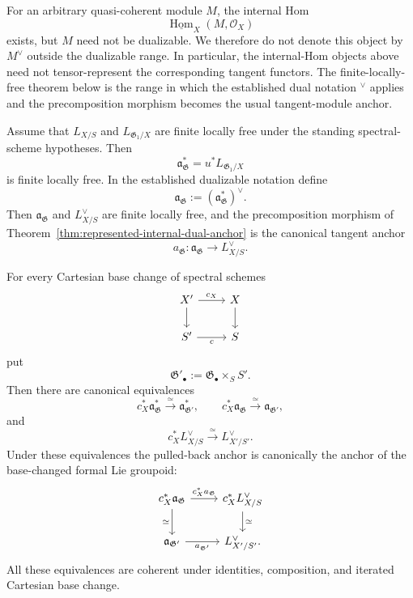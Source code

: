 \begin{remark}
\label{rem:internal-dual-not-tangent-representing}
For an arbitrary quasi-coherent module $M$, the internal Hom
\[
    \underline{\operatorname{Hom}}_X(M,\mathcal O_X)
\]
exists, but $M$ need not be dualizable.  We therefore do not denote this
object by $M^\vee$ outside the dualizable range.  In particular, the
internal-Hom objects above need not tensor-represent the corresponding
tangent functors.  The finite-locally-free theorem below is the range in
which the established dual notation ${}^\vee$ applies and the
precomposition morphism becomes the usual tangent-module anchor.
\end{remark}

\begin{theorem}
\label{thm:represented-first-order-anchor}
Assume that $L_{X/S}$ and
$L_{\mathfrak G_1/X}$ are finite locally free under the standing
spectral-scheme hypotheses.  Then
\[
    \mathfrak a_{\mathfrak G}^{*}
    =
    u^*L_{\mathfrak G_1/X}
\]
is finite locally free.  In the established dualizable notation define
\[
    \mathfrak a_{\mathfrak G}
    :=
    \left(
        \mathfrak a_{\mathfrak G}^{*}
    \right)^\vee.
\]
Then $\mathfrak a_{\mathfrak G}$ and $L_{X/S}^{\vee}$ are finite locally free,
and the precomposition morphism of
Theorem~\ref{thm:represented-internal-dual-anchor} is the canonical tangent
anchor
\[
\boxed{
    a_{\mathfrak G}:
    \mathfrak a_{\mathfrak G}
    \longrightarrow
    L_{X/S}^{\vee}.
}
\]

For every Cartesian base change of spectral schemes
\[
\begin{tikzcd}
X' \arrow[r,"c_X"] \arrow[d] &
X \arrow[d]\\
S' \arrow[r,"c"'] &
S
\end{tikzcd}
\]
put
\[
    \mathfrak G'_\bullet
    :=
    \mathfrak G_\bullet\times_SS'.
\]
Then there are canonical equivalences
\[
    c_X^*\mathfrak a_{\mathfrak G}^{*}
    \xrightarrow{\simeq}
    \mathfrak a_{\mathfrak G'}^{*},
    \qquad
    c_X^*\mathfrak a_{\mathfrak G}
    \xrightarrow{\simeq}
    \mathfrak a_{\mathfrak G'},
\]
and
\[
    c_X^*L_{X/S}^{\vee}
    \xrightarrow{\simeq}
    L_{X'/S'}^{\vee}.
\]
Under these equivalences the pulled-back anchor is canonically the anchor of
the base-changed formal Lie groupoid:
\[
\begin{tikzcd}
c_X^*\mathfrak a_{\mathfrak G}
    \arrow[r,"{c_X^*a_{\mathfrak G}}"]
    \arrow[d,"\simeq"']
&
c_X^*L_{X/S}^{\vee}
    \arrow[d,"\simeq"]
\\
\mathfrak a_{\mathfrak G'}
    \arrow[r,"{a_{\mathfrak G^{\prime}}}"']
&
L_{X'/S'}^{\vee}.
\end{tikzcd}
\]
All these equivalences are coherent under identities, composition, and
iterated Cartesian base change.
\end{theorem}

